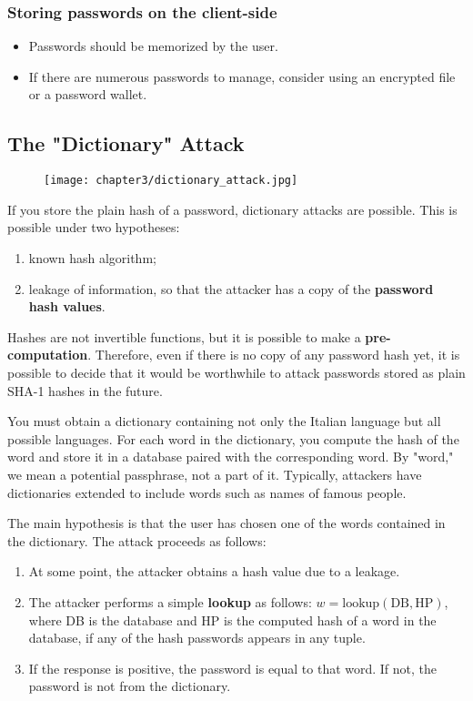 \subsubsection{Storing passwords on the client-side}
\begin{itemize}
  \item Passwords should be memorized by the user.
  \item If there are numerous passwords to manage, consider using an encrypted file or a password wallet.
\end{itemize}



\subsection{The "Dictionary" Attack}
\begin{figure}[h]
  \centering
  \texttt{[image: chapter3/dictionary\_attack.jpg]}
\end{figure}

If you store the plain hash of a password, dictionary attacks are possible. This is possible under two hypotheses:
\begin{enumerate}
  \item known hash algorithm;
  \item leakage of information, so that the attacker has a copy of the \textbf{password hash values}.
\end{enumerate}
Hashes are not invertible functions, but it is possible to make a \textbf{pre-computation}. Therefore, even if there is no copy of any password hash yet, it is possible to decide that it would be worthwhile to attack passwords stored as plain SHA-1 hashes in the future.

You must obtain a dictionary containing not only the Italian language but all possible languages.
For each word in the dictionary, you compute the hash of the word and store it in a database paired with the corresponding word.
By "word," we mean a potential passphrase, not a part of it.
Typically, attackers have dictionaries extended to include words such as names of famous people.


The main hypothesis is that the user has chosen one of the words contained in the dictionary. The attack proceeds as follows:
\begin{enumerate}
  \item At some point, the attacker obtains a hash value due to a leakage.
  \item The attacker performs a simple \textbf{lookup} as follows:
        \( w = \mathrm{lookup}(\mathrm{DB}, \mathrm{HP}) \),
        where DB is the database
        and HP is the computed hash of a word in the database, if any of the hash passwords appears in any tuple.
  \item If the response is positive, the password is equal to that word. If not, the password is not from the dictionary.
\end{enumerate}

